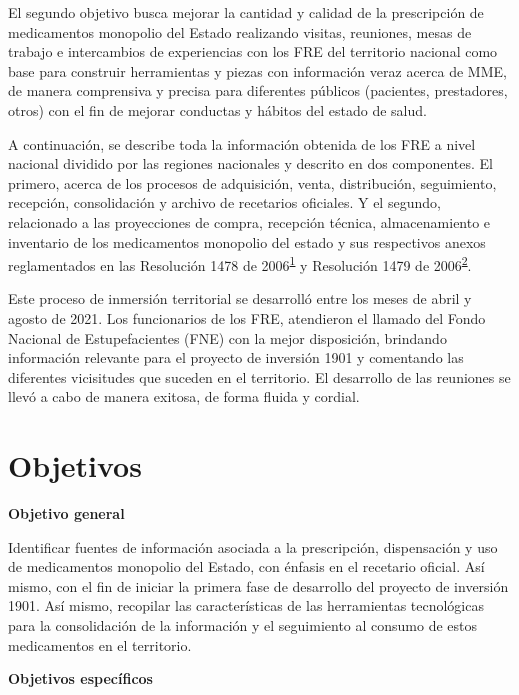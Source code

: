 \documentclass[
]{book}
\begin{document}
El segundo objetivo busca mejorar la cantidad y calidad de la prescripción de medicamentos monopolio del Estado realizando visitas, reuniones, mesas de trabajo e intercambios de experiencias con los FRE del territorio nacional como base para construir herramientas y piezas con información veraz acerca de MME, de manera comprensiva y precisa para diferentes públicos (pacientes, prestadores, otros) con el fin de mejorar conductas y hábitos del estado de salud.

A continuación, se describe toda la información obtenida de los FRE a nivel nacional dividido por las regiones nacionales y descrito en dos componentes. El primero, acerca de los procesos de adquisición, venta, distribución, seguimiento, recepción, consolidación y archivo de recetarios oficiales. Y el segundo, relacionado a las proyecciones de compra, recepción técnica, almacenamiento e inventario de los medicamentos monopolio del estado y sus respectivos anexos reglamentados en las Resolución 1478 de 2006\textsuperscript{\protect\hyperlink{ref-MSPS1478-2006}{1}} y Resolución 1479 de 2006\textsuperscript{\protect\hyperlink{ref-MSPS1479-2006}{2}}.

Este proceso de inmersión territorial se desarrolló entre los meses de abril y agosto de 2021. Los funcionarios de los FRE, atendieron el llamado del Fondo Nacional de Estupefacientes (FNE) con la mejor disposición, brindando información relevante para el proyecto de inversión 1901 y comentando las diferentes vicisitudes que suceden en el territorio. El desarrollo de las reuniones se llevó a cabo de manera exitosa, de forma fluida y cordial.

\hypertarget{objetivos}{%
\chapter{Objetivos}\label{objetivos}}

\textbf{Objetivo general}

Identificar fuentes de información asociada a la prescripción, dispensación y uso de medicamentos monopolio del Estado, con énfasis en el recetario oficial. Así mismo, con el fin de iniciar la primera fase de desarrollo del proyecto de inversión 1901. Así mismo, recopilar las características de las herramientas tecnológicas para la consolidación de la información y el seguimiento al consumo de estos medicamentos en el territorio.

\textbf{Objetivos específicos}
\end{document}
